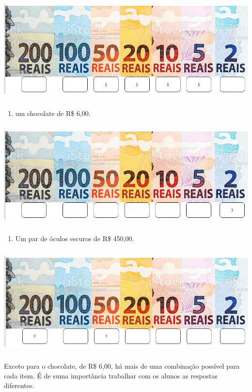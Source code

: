 \includegraphics[width=5.90556in,height=2.18056in]{media/image68.png}

\begin{enumerate}
\def\labelenumi{\Alph{enumi})}
\item
  um chocolate de R\$ 6,00.
\end{enumerate}

\includegraphics[width=5.90556in,height=2.14583in]{media/image69.png}

\begin{enumerate}
\def\labelenumi{\Alph{enumi})}
\item
  Um par de óculos escuros de R\$ 450,00.
\end{enumerate}

\includegraphics[width=5.90556in,height=2.19931in]{media/image70.png}

Exceto para o chocolate, de R\$ 6,00, há mais de uma combinação possível para cada item. É de suma importância
trabalhar com os alunos as respostas diferentes.

